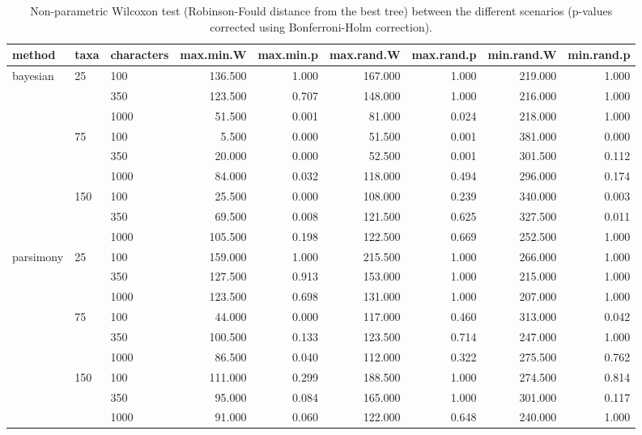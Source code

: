 \begin{table}[ht]
\centering
\begin{tabular}{lllrrrrrr}
  \hline
method & taxa & characters & max.min.W & max.min.p & max.rand.W & max.rand.p & min.rand.W & min.rand.p \\ 
  \hline
bayesian & 25 & 100 & 136.500 & 1.000 & 167.000 & 1.000 & 219.000 & 1.000 \\ 
   &  & 350 & 123.500 & 0.707 & 148.000 & 1.000 & 216.000 & 1.000 \\ 
   &  & 1000 & 51.500 & 0.001 & 81.000 & 0.024 & 218.000 & 1.000 \\ 
   & 75 & 100 & 5.500 & 0.000 & 51.500 & 0.001 & 381.000 & 0.000 \\ 
   &  & 350 & 20.000 & 0.000 & 52.500 & 0.001 & 301.500 & 0.112 \\ 
   &  & 1000 & 84.000 & 0.032 & 118.000 & 0.494 & 296.000 & 0.174 \\ 
   & 150 & 100 & 25.500 & 0.000 & 108.000 & 0.239 & 340.000 & 0.003 \\ 
   &  & 350 & 69.500 & 0.008 & 121.500 & 0.625 & 327.500 & 0.011 \\ 
   &  & 1000 & 105.500 & 0.198 & 122.500 & 0.669 & 252.500 & 1.000 \\ 
  parsimony & 25 & 100 & 159.000 & 1.000 & 215.500 & 1.000 & 266.000 & 1.000 \\ 
   &  & 350 & 127.500 & 0.913 & 153.000 & 1.000 & 215.000 & 1.000 \\ 
   &  & 1000 & 123.500 & 0.698 & 131.000 & 1.000 & 207.000 & 1.000 \\ 
   & 75 & 100 & 44.000 & 0.000 & 117.000 & 0.460 & 313.000 & 0.042 \\ 
   &  & 350 & 100.500 & 0.133 & 123.500 & 0.714 & 247.000 & 1.000 \\ 
   &  & 1000 & 86.500 & 0.040 & 112.000 & 0.322 & 275.500 & 0.762 \\ 
   & 150 & 100 & 111.000 & 0.299 & 188.500 & 1.000 & 274.500 & 0.814 \\ 
   &  & 350 & 95.000 & 0.084 & 165.000 & 1.000 & 301.000 & 0.117 \\ 
   &  & 1000 & 91.000 & 0.060 & 122.000 & 0.648 & 240.000 & 1.000 \\ 
   \hline
\end{tabular}
\caption{Non-parametric Wilcoxon test (Robinson-Fould distance from the best tree) between the different scenarios (p-values corrected using Bonferroni-Holm correction).} 
\label{Tab_BCRFbest}
\end{table}
